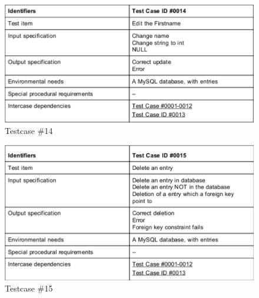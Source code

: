 \begin{figure}
 \includegraphics[scale=1]{images/dbtestcase0014}
  \caption{Testcase \#14}
  \label{fig:dbcase14}
\end{figure}

\begin{figure}
 \includegraphics[scale=1]{images/dbtestcase0015}
  \caption{Testcase \#15}
  \label{fig:dbcase15}
\end{figure}

